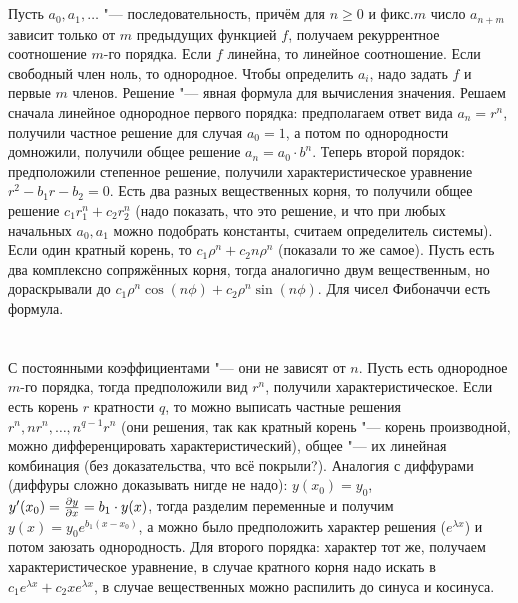 \section{} %
Пусть $a_0, a_1, \dots$ "--- последовательность, причём для $n\ge 0$ и фикс.$m$
число $a_{n+m}$ зависит только от $m$ предыдущих функцией $f$, получаем рекуррентное соотношение $m$-го порядка.
Если $f$ линейна, то линейное соотношение.
Если свободный член ноль, то однородное.
Чтобы определить $a_i$, надо задать $f$ и первые $m$ членов.
Решение "--- явная формула для вычисления значения.
Решаем сначала линейное однородное первого порядка: предполагаем ответ вида $a_n=r^n$, получили частное решение
для случая $a_0=1$, а потом по однородности домножили, получили общее решение $a_n=a_0\cdot b^n$.
Теперь второй порядок: предположили степенное решение, получили характеристическое уравнение $r^2-b_1r-b_2=0$.
Есть два разных вещественных корня, то получили общее решение $c_1r_1^n+c_2r_2^n$ (надо показать, что это решение,
и что при любых начальных $a_0, a_1$ можно подобрать константы, считаем определитель системы).
Если один кратный корень, то $c_1\rho^n+c_2n\rho^n$ (показали то же самое).
Пусть есть два комплексно сопряжённых корня, тогда аналогично двум вещественным, но дораскрывали до
$c_1 \rho^n \cos (n \phi) + c_2\rho^n \sin(n \phi)$.
Для чисел Фибоначчи есть формула.

\section{} %
С постоянными коэффициентами "--- они не зависят от $n$.
Пусть есть однородное $m$-го порядка, тогда предположили вид $r^n$, получили характеристическое.
Если есть корень $r$ кратности $q$, то можно выписать частные решения $r^n, nr^n, \dots, n^{q-1}r^n$ (они решения,
так как кратный корень "--- корень производной, можно дифференцировать характеристический),
общее "--- их линейная комбинация (без доказательства, что всё покрыли?).
Аналогия с диффурами (диффуры сложно доказывать нигде не надо): $y(x_0)=y_0$, $y'(x_0)=\frac{\partial y}{\partial x}=b_1\cdot y(x)$, тогда разделим переменные и получим
$y(x)=y_0e^{b_1(x-x_0)}$, а можно было предположить характер решения ($e^{\lambda x}$) и потом заюзать однородность.
Для второго порядка: характер тот же, получаем характеристическое уравнение, в случае кратного корня
надо искать в $c_1e^{\lambda x}+c_2xe^{\lambda x}$, в случае вещественных можно распилить до синуса и косинуса.

